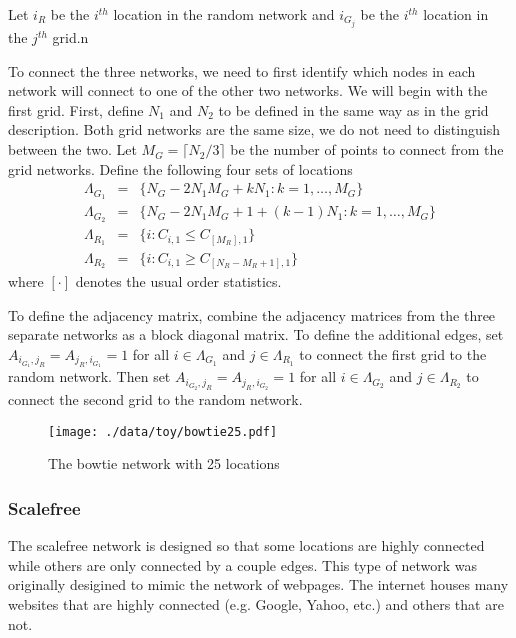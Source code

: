 \documentclass[11pt]{article}
\begin{document}
Let $i_{R}$ be the $i^{th}$ location in the random network and
$i_{G_j}$ be the $i^{th}$ location in the $j^{th}$ grid.n

To connect the three networks, we need to first identify which nodes
in each network will connect to one of the other two networks.  We
will begin with the first grid.  First, define $N_1$ and $N_2$ to be
defined in the same way as in the grid description.  Both grid
networks are the same size, we do not need to distinguish between the
two.  Let $M_{G} = \lceil N_2/3 \rceil$ be the number of points to
connect from the grid networks.  Define the following four sets of locations
\begin{equation*}
  \begin{array}{rcl}
    \Lambda_{G_1} & = & \lbrace N_G -
                        2N_1M_G + kN_1 : k = 1,\ldots,M_G\rbrace\\
    \Lambda_{G_2} & = & \lbrace N_G -
                        2N_1M_G + 1 + (k-1)N_1 : k =
                        1,\ldots,M_G\rbrace\\
    \Lambda_{R_1} & = & \lbrace i : C_{i,1} \le C_{[M_R],1} \rbrace\\
    \Lambda_{R_2} & = & \lbrace i : C_{i,1} \ge C_{[N_R - M_R + 1],1} \rbrace
  \end{array}
\end{equation*}
where $[\cdot]$ denotes the usual order statistics.

To define the adjacency matrix, combine the adjacency matrices from
the three separate networks as a block diagonal matrix.  To define the
additional edges, set $A_{i_{G_1},j_R} = A_{j_R,i_{G_1}} = 1$ for all
$i \in \Lambda_{G_1}$ and $j \in \Lambda_{R_1}$ to connect the first
grid to the random network.  Then set $A_{i_{G_2},j_R} =
A_{j_R,i_{G_2}} = 1$ for all $i \in \Lambda_{G_2}$ and $j \in
\Lambda_{R_2}$ to connect the second grid to the random network.



\begin{figure}[htb]
\centering
\texttt{[image: ./data/toy/bowtie25.pdf]}
\caption{\label{fig:bowtie25}The bowtie network with 25 locations}
\end{figure}


\subsubsection{Scalefree}
\label{sec-1-3-6}

The scalefree network is designed so that some locations are highly
connected while others are only connected by a couple edges.  This
type of network was originally desigined to mimic the network of
webpages.  The internet houses many websites that are highly
connected (e.g. Google, Yahoo, etc.) and others that are not.
\end{document}
